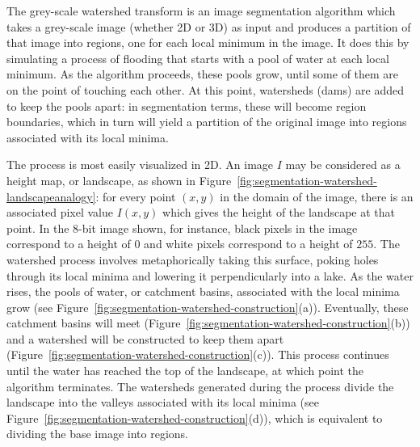The grey-scale watershed transform is an image segmentation algorithm which takes a grey-scale image (whether 2D or 3D) as input and produces a partition of that image into regions, one for each local minimum in the image. It does this by simulating a process of flooding that starts with a pool of water at each local minimum. As the algorithm proceeds, these pools grow, until some of them are on the point of touching each other. At this point, watersheds (dams) are added to keep the pools apart: in segmentation terms, these will become region boundaries, which in turn will yield a partition of the original image into regions associated with its local minima.


The process is most easily visualized in 2D. An image $I$ may be considered as a height map, or landscape, as shown in Figure~\ref{fig:segmentation-watershed-landscapeanalogy}: for every point $(x,y)$ in the domain of the image, there is an associated pixel value $I(x,y)$ which gives the height of the landscape at that point. In the 8-bit image shown, for instance, black pixels in the image correspond to a height of $0$ and white pixels correspond to a height of $255$. The watershed process involves metaphorically taking this surface, poking holes through its local minima and lowering it perpendicularly into a lake. As the water rises, the pools of water, or catchment basins, associated with the local minima grow (see Figure~\ref{fig:segmentation-watershed-construction}(a)). Eventually, these catchment basins will meet (Figure~\ref{fig:segmentation-watershed-construction}(b)) and a watershed will be constructed to keep them apart (Figure~\ref{fig:segmentation-watershed-construction}(c)). This process continues until the water has reached the top of the landscape, at which point the algorithm terminates. The watersheds generated during the process divide the landscape into the valleys associated with its local minima (see Figure~\ref{fig:segmentation-watershed-construction}(d)), which is equivalent to dividing the base image into regions.

